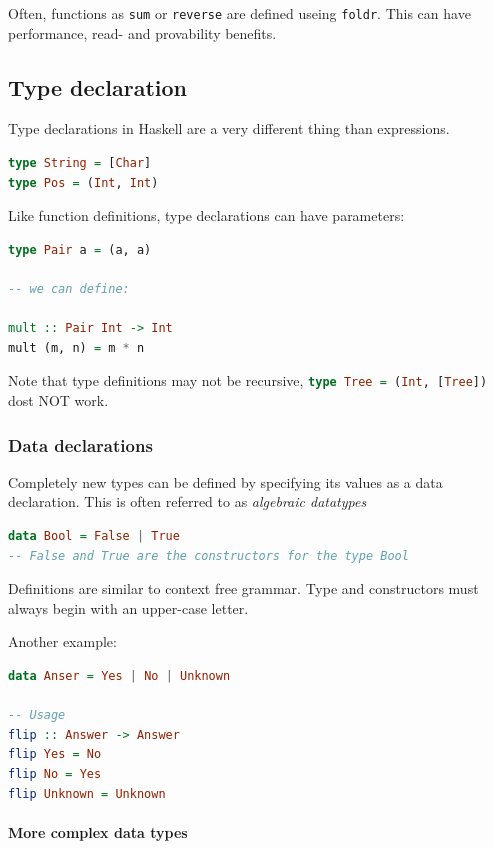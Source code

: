 Often, functions as \lstinline|sum| or \lstinline|reverse| are defined useing \lstinline|foldr|. This can have performance, read- and provability benefits.

\subsection{Type declaration}

Type declarations in Haskell are a very different thing than expressions.

\begin{lstlisting}[language=haskell]
type String = [Char]
type Pos = (Int, Int)
\end{lstlisting}

Like function definitions, type declarations can have parameters:
\begin{lstlisting}[language=haskell]
type Pair a = (a, a)

-- we can define:

mult :: Pair Int -> Int
mult (m, n) = m * n
\end{lstlisting}

Note that type definitions may not be recursive, \lstinline[language=haskell]|type Tree = (Int, [Tree])| dost NOT work.

\subsubsection{Data declarations}

Completely new types can be defined by specifying its values as a data declaration. This is often referred to as \emph{algebraic datatypes}
\begin{lstlisting}[language=haskell]
data Bool = False | True
-- False and True are the constructors for the type Bool
\end{lstlisting}

Definitions are similar to context free grammar. Type and constructors must always begin with an upper-case letter.

Another example:
\begin{lstlisting}[language=haskell]
data Anser = Yes | No | Unknown

-- Usage
flip :: Answer -> Answer
flip Yes = No
flip No = Yes
flip Unknown = Unknown
\end{lstlisting}

\paragraph{More complex data types} \hfill \\

